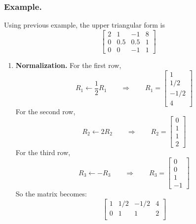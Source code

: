 \documentclass[../../../main.tex]{subfiles}
\begin{document}
\subsubsection{Example.} Using previous example, the upper triangular form is
\begin{equation*}
    \begin{bmatrix}
        2 & 1   & -1  & 8 \\
        0 & 0.5 & 0.5 & 1 \\
        0 & 0   & -1  & 1
    \end{bmatrix}
\end{equation*}
\begin{enumerate}
    \item \textbf{Normalization.}
          For the first row,
          \begin{equation*}
              R_1 \leftarrow \frac{1 }{2 }R_1\qquad\Rightarrow\qquad R_1=
              \begin{bmatrix}
                  1 \\1/2\\-1/2\\4
              \end{bmatrix}
          \end{equation*}
          For the second row,
          \begin{equation*}
              R_2 \leftarrow 2R_2 \qquad\Rightarrow\qquad R_2=
              \begin{bmatrix}
                  0 \\1\\1\\2
              \end{bmatrix}
          \end{equation*}
          For the third row,
          \begin{equation*}
              R_3 \leftarrow -R_3 \qquad\Rightarrow\qquad R_3=
              \begin{bmatrix}
                  0 \\0\\1\\-1
              \end{bmatrix}
          \end{equation*}
          So the matrix becomes:
          \begin{equation*}
              \begin{bmatrix}
                  1 & 1/2 & -1/2 & 4 \\
                  0 & 1   & 1    & 2 \\

\end{bmatrix}
\end{equation*}
\end{enumerate}
\end{document}
